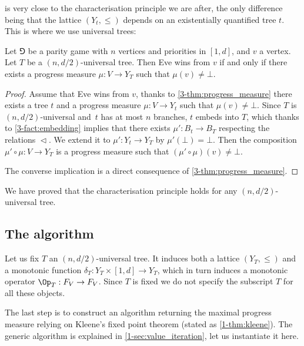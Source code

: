  is very close to the characterisation principle we are after,
the only difference being that the lattice $(Y_t,\le)$ depends on an existentially quantified tree $t$.
This is where we use universal trees:

\begin{corollary}
\label{3-cor:progress_measure}
Let $\Game$ be a parity game with $n$ vertices and priorities in $[1,d]$, and $v$ a vertex.
Let $T$ be a $(n,d/2)$-universal tree.
Then Eve wins from $v$ if and only if there exists a progress measure $\mu : V \to Y_T$ such that $\mu(v) \neq \bot$.
\end{corollary}

\begin{proof}
Assume that Eve wins from $v$, thanks to \cref{3-thm:progress_measure} there exists a tree $t$ and a progress measure $\mu : V \to Y_t$ 
such that $\mu(v) \neq \bot$.
Since $T$ is $(n,d/2)$-universal and~$t$ has at most $n$ branches, $t$ embeds into $T$,
which thanks to \cref{3-fact:embedding} implies that there exists $\mu' : B_t \to B_T$ respecting the relations $\vartriangleleft$.
We extend it to $\mu' : Y_t \to Y_T$ by $\mu'(\bot) = \bot$.
Then the composition $\mu' \circ \mu : V \to Y_T$ is a progress measure such that $(\mu' \circ \mu)(v) \neq \bot$. 

The converse implication is a direct consequence of \cref{3-thm:progress_measure}.
\end{proof}

We have proved that the characterisation principle holds for any $(n,d/2)$-universal tree.

\subsection*{The algorithm}
Let us fix $T$ an $(n,d/2)$-universal tree.
It induces both a lattice $(Y_T,\le)$ and a monotonic function $\delta_T : Y_T \times [1,d] \to Y_T$,
which in turn induces a monotonic operator $\Op_T : F_V \to F_V$.
Since $T$ is fixed we do not specify the subscript $T$ for all these objects.


The last step is to construct an algorithm returning the maximal progress measure relying on Kleene's fixed point theorem (stated as \cref{1-thm:kleene}).
The generic algorithm is explained in \cref{1-sec:value_iteration}, let us instantiate it here.

